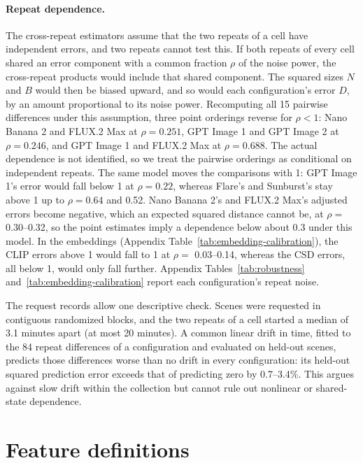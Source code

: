 \paragraph{Repeat dependence.}
The cross-repeat estimators assume that the two repeats of a cell have independent errors, and
two repeats cannot test this. If both repeats of every cell shared an error component with a
common fraction $\rho$ of the noise power, the cross-repeat products would include that shared
component. The squared sizes $N$ and $B$ would then be biased upward, and so would each
configuration's error $D$, by an amount proportional to its noise power. Recomputing all 15
pairwise differences under this assumption, three point orderings reverse for $\rho<1$: Nano
Banana 2 and FLUX.2 Max at $\rho=0.251$, GPT Image 1 and GPT Image 2 at $\rho=0.246$, and GPT
Image 1 and FLUX.2 Max at $\rho=0.688$. The actual dependence is not identified, so we treat the
pairwise orderings as conditional on independent repeats. The same model moves the comparisons
with 1: GPT Image 1's error would fall below 1 at $\rho=0.22$, whereas Flare's and Sunburst's stay
above 1 up to $\rho=0.64$ and 0.52. Nano Banana 2's and FLUX.2 Max's adjusted errors become negative,
which an expected squared distance cannot be, at $\rho=$ 0.30--0.32, so the point estimates imply a
dependence below about 0.3 under this model. In the embeddings (Appendix
Table~\ref{tab:embedding-calibration}), the CLIP errors above 1 would fall to 1 at $\rho=$
0.03--0.14, whereas the CSD errors, all below 1, would only fall further. Appendix
Tables~\ref{tab:robustness} and~\ref{tab:embedding-calibration} report each configuration's repeat
noise.

The request records allow one descriptive check. Scenes were requested in contiguous randomized
blocks, and the two repeats of a cell started a median of 3.1 minutes apart (at most 20 minutes).
A common linear drift in time, fitted to the 84 repeat differences of a configuration and
evaluated on held-out scenes, predicts those differences worse than no drift in every
configuration: its held-out squared prediction error exceeds that of predicting zero by 0.7--3.4\%.
This
argues against slow drift within the collection but cannot rule out nonlinear or shared-state
dependence.

\FloatBarrier
\section{Feature definitions}\label{app:features}

